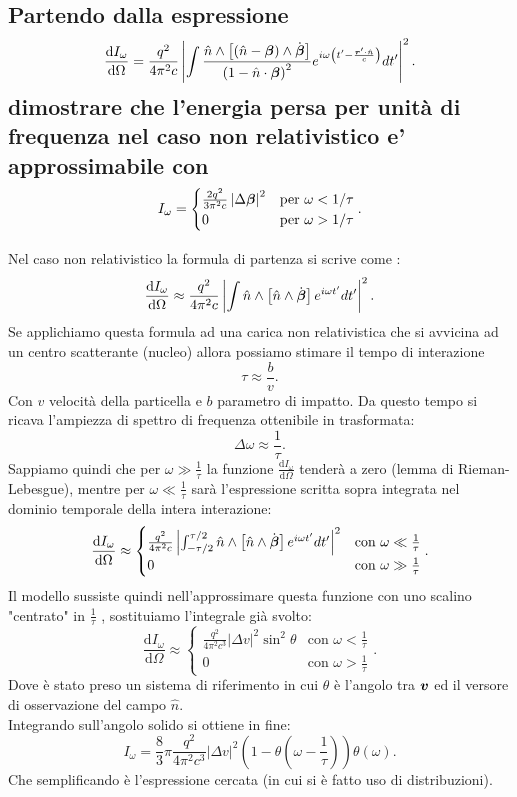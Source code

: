 \subsection[]{Partendo dalla espressione\[
	\frac{\mbox{d} I_{\omega}}{\mbox{d} \Omega} = \frac{q^2}{4\pi^2 c}
	\left|\int\frac{\hat{n}\wedge\left[\left(\hat{n}-\boldsymbol{\beta}\right)\wedge\dot{\boldsymbol{\beta}}\right]}{\left(1-\hat{n}\cdot\boldsymbol{\beta}\right)^2}
	e^{i\omega\left(t'-\frac{\boldsymbol{r}'\cdot\hat{n}}{c}\right)}dt'\right|^2.\] 
dimostrare che l’energia persa per unità di frequenza nel caso non relativistico e’ approssimabile con \[
	I_{\omega}=
	\begin{cases}
		\frac{2q^2}{3\pi^2 c}\left| \Delta \boldsymbol{\beta} \right|^2  &\text{per } \omega< 1 /\tau\\  
		0 & \text{per } \omega > 1 /\tau
	\end{cases}.\] }
\label{sec:4.b.6}
Nel caso non relativistico la formula di partenza si scrive come :
\[
	\frac{\mbox{d} I_{\omega}}{\mbox{d} \Omega} \approx \frac{q^2}{4\pi^2 c}
	\left|\int\hat{n}\wedge\left[\hat{n}\wedge\dot{\boldsymbol{\beta}}\right]
	e^{i\omega t'}dt'\right|^2
.\] 
Se applichiamo questa formula ad una carica non relativistica che si avvicina ad un centro scatterante (nucleo) allora possiamo stimare il tempo di interazione \[
	\tau \approx \frac{b}{v}
.\] 
Con $v$ velocità della particella e $b$ parametro di impatto. Da questo tempo si ricava l'ampiezza di spettro di frequenza ottenibile in trasformata: \[
	\Delta \omega \approx \frac{1}{\tau}
.\] 
Sappiamo quindi che per $\omega\gg \frac{1}{\tau}$ la funzione $\frac{\mbox{d} I_{\omega}}{\mbox{d} \Omega}$ tenderà a zero (lemma di Rieman-Lebesgue), mentre per $\omega\ll \frac{1}{\tau}$ sarà l'espressione scritta sopra integrata nel dominio temporale della intera interazione:\[
	\frac{\mbox{d} I_{\omega}}{\mbox{d} \Omega} \approx 
	\begin{cases}
		\frac{q^2}{4\pi^2 c}
		\left|\int_{- \tau /2}^{\tau /2}\hat{n}\wedge\left[\hat{n}\wedge\dot{\boldsymbol{\beta}}\right]
		e^{i\omega t'}dt'\right|^2 		& \text{con } \omega \ll \frac{1}{\tau}\\
		0					& \text{con } \omega \gg \frac{1}{\tau}
	\end{cases}
.\] 
Il modello sussiste quindi nell'approssimare questa funzione con uno scalino "centrato" in $\frac{1}{\tau}$ , sostituiamo l'integrale già svolto:
\[
	\frac{\mbox{d} I_{\omega}}{\mbox{d} \Omega} \approx 
	\begin{cases}
		\frac{q^2}{4\pi^2 c^3} \left| \Delta v \right|^2\sin^2\theta			& \text{con } \omega < \frac{1}{\tau}\\
		0										& \text{con } \omega > \frac{1}{\tau}
	\end{cases}
.\] 
Dove è stato preso un sistema di riferimento in cui $\theta$ è l'angolo tra $\boldsymbol{v}$ ed il versore di osservazione del campo $\hat{n}$. \\
Integrando sull'angolo solido si ottiene in fine:
\[
	I_{\omega}=\frac{8}{3}\pi\frac{q^2}{4\pi^2c^3}\left|\Delta v\right|^2\left(1-\theta\left(\omega-\frac{1}{\tau}\right)\right)\theta\left(\omega\right)
.\] 
Che semplificando è l'espressione cercata (in cui si è fatto uso di distribuzioni).

